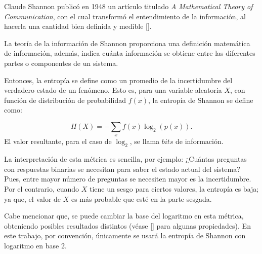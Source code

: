 \documentclass[../main.tex]{subfiles}
\begin{document}

Claude Shannon publicó en 1948 un artículo titulado \textit{A Mathematical Theory of Communication}, con el cual transformó el entendimiento de la información, al hacerla una cantidad bien definida y medible [\cite{stone2015information}].

La teoría de la información de Shannon proporciona una definición matemática de información, además, indica cuánta información se obtiene entre las diferentes partes o componentes de un sistema.

Entonces, la entropía se define como un promedio de la incertidumbre del verdadero estado de un fenómeno. Esto es, para una variable aleatoria $X$, con función de distribución de probabilidad $f(x)$, la entropía de Shannon se define como: 

\begin{equation}
    \label{shannon-entropy}
    H(X) = - \sum_{x} f(x) \log_{2} ( p(x)).
\end{equation}
El valor resultante, para el caso de $\log_{2}$, se llama $bits$ de información. 

La interpretación de esta métrica es sencilla, por ejemplo: ¿Cuántas preguntas con respuestas binarias se necesitan para saber el estado actual del sistema? Pues, entre mayor número de preguntas se necesiten mayor es la incertidumbre. Por el contrario, cuando $X$ tiene un sesgo para ciertos valores, la entropía es baja; ya que, el valor de $X$ es más probable que esté en la parte sesgada. 

Cabe mencionar que, se puede cambiar la base del logaritmo en esta métrica, obteniendo posibles resultados distintos (véase [\cite{cover2006elements}] para algunas propiedades). En este trabajo, por convención, únicamente se usará la entropía de Shannon con logaritmo en base 2.
\end{document}
